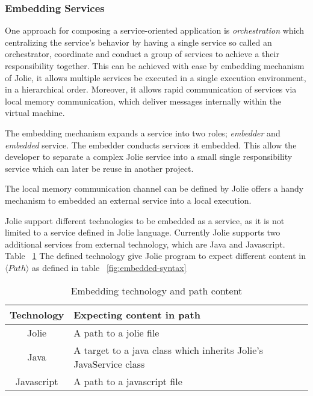\subsubsection{Embedding Services}
\label{sec:embedded}

One approach for composing a service-oriented application is \textit{orchestration} which centralizing the service's behavior by having a single service so called an orchestrator, coordinate and conduct a group of services to achieve a their responsibility together. This can be achieved with ease by embedding mechanism of Jolie, it allows multiple services be executed in a single execution environment, in a hierarchical order.
Moreover, it allows rapid communication of services via local memory communication, which deliver messages internally within the virtual machine.

The embedding mechanism expands a service into two roles; \textit{embedder} and \textit{embedded} service. The embedder conducts services it embedded. This allow the developer to separate a complex Jolie service into a small single responsibility service which can later be reuse in another project. 

The local memory communication channel can be defined by 
Jolie offers a handy mechanism to embedded an external service into a local execution. 

Jolie support different technologies to be embedded as a service, as it is not limited to a service defined in Jolie language. Currently Jolie supports two additional services from external technology, which are Java and Javascript. Table ~\ref{table:embedded-technology-path} The defined technology give Jolie program to expect different content in \(\langle Path \rangle\) as defined in table ~\ref{fig:embedded-syntax}

\begin{table}[h]
    \centering
    \begin{tabular}{ |c|l| }
        \hline
        Technology & Expecting content in path                                         \\
        \hline
        Jolie      & A path to a jolie file                                            \\
        Java       & A target to a java class which inherits Jolie's JavaService class \\
        Javascript & A path to a javascript file                                       \\
        \hline
    \end{tabular}
    \caption{Embedding technology and path content}
    \label{table:embedded-technology-path}
\end{table}


